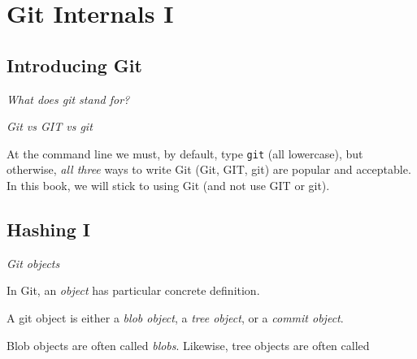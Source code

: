 \chapter{Git Internals I}




\section{Introducing Git}


\frmrule

\textit{What does git stand for?}


\frmrule

\textit{Git vs GIT vs git}

At the command line we must, by default, type \lstinline{git} (all lowercase), but 
otherwise, \textit{all three} ways to 
write Git (Git, GIT, git) are popular and acceptable.
In this book, we will stick to using Git (and not use GIT or git).

\frmrule 


\section{Hashing I}


\frmrule 

\textit{Git objects}

In Git, an \textit{object} has particular concrete definition.


A git object is either a \textit{blob object}, 
a \textit{tree object}, or a \textit{commit object}. 


\begin{figure}[h]
\end{figure}

Blob objects are often called \textit{blobs}. 
Likewise, tree objects are often called  


